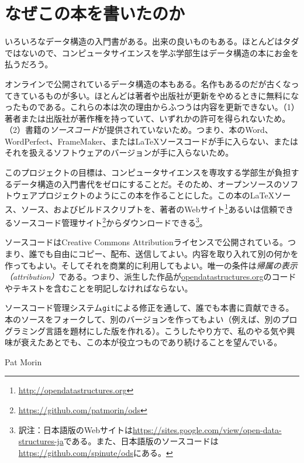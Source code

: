 \chapter*{なぜこの本を書いたのか}

いろいろなデータ構造の入門書がある。出来の良いものもある。ほとんどはタダではないので、コンピュータサイエンスを学ぶ学部生はデータ構造の本にお金を払うだろう。

オンラインで公開されているデータ構造の本もある。名作もあるのだが古くなってきているものが多い。ほとんどは著者や出版社が更新をやめるときに無料になったものである。これらの本は次の理由からふつうは内容を更新できない。（1）著者または出版社が著作権を持っていて、いずれかの許可を得られないため。（2）書籍の\emph{ソースコード}が提供されていないため。つまり、本のWord、WordPerfect、FrameMaker、または\LaTeX{}ソースコードが手に入らない、またはそれを扱えるソフトウェアのバージョンが手に入らないため。

このプロジェクトの目標は、コンピュータサイエンスを専攻する学部生が負担するデータ構造の入門書代をゼロにすることだ。そのため、オープンソースのソフトウェアプロジェクトのようにこの本を作ることにした。この本の\LaTeX{}ソース、\lang{}ソース、およびビルドスクリプトを、著者のWebサイト\footnote {\url{http://opendatastructures.org}}あるいは信頼できるソースコード管理サイト\footnote {\url{https://github.com/patmorin/ods}}からダウンロードできる\footnote {訳注：日本語版のWebサイトは\url{https://sites.google.com/view/open-data-structures-ja}である。また、日本語版のソースコードは\url{https://github.com/spinute/ods}にある。}。

ソースコードはCreative Commons Attributionライセンスで公開されている。つまり、誰でも自由にコピー、配布、送信してよい。内容を取り入れて別の何かを作ってもよい。そしてそれを商業的に利用してもよい。唯一の条件は\emph{帰属の表示（attribution）}である。つまり、派生した作品が\url{opendatastructures.org}のコードやテキストを含むことを明記しなければならない。

ソースコード管理システム\texttt{git}による修正を通して、誰でも本書に貢献できる。本のソースをフォークして、別のバージョンを作ってもよい（例えば、別のプログラミング言語を題材にした版を作れる）。こうしたやり方で、私のやる気や興味が衰えたあとでも、この本が役立つものであり続けることを望んでいる。

\hfill Pat Morin
